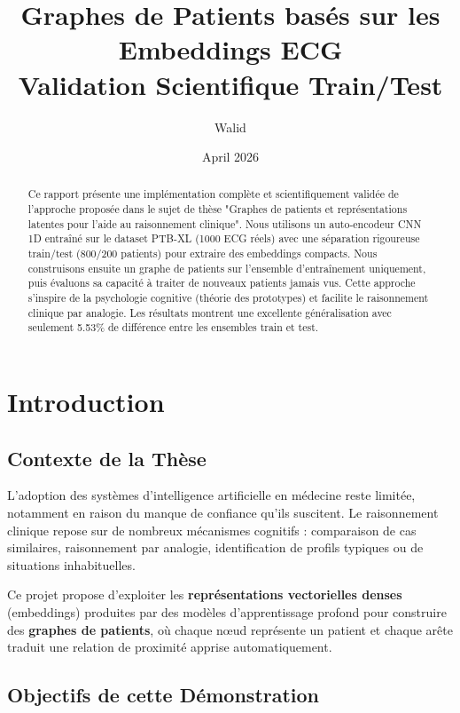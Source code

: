 \documentclass[12pt,a4paper]{article}
\title{\textbf{Graphes de Patients basés sur les Embeddings ECG} \\
\large{Validation Scientifique Train/Test}}
\author{Walid}
\date{April 2026}
\begin{document}
\maketitle

\begin{abstract}
Ce rapport présente une implémentation complète et scientifiquement validée de l'approche proposée dans le sujet de thèse "Graphes de patients et représentations latentes pour l'aide au raisonnement clinique". Nous utilisons un auto-encodeur CNN 1D entraîné sur le dataset PTB-XL (1000 ECG réels) avec une séparation rigoureuse train/test (800/200 patients) pour extraire des embeddings compacts. Nous construisons ensuite un graphe de patients sur l'ensemble d'entraînement uniquement, puis évaluons sa capacité à traiter de nouveaux patients jamais vus. Cette approche s'inspire de la psychologie cognitive (théorie des prototypes) et facilite le raisonnement clinique par analogie. Les résultats montrent une excellente généralisation avec seulement 5.53\% de différence entre les ensembles train et test.
\end{abstract}

\tableofcontents
\newpage

\section{Introduction}

\subsection{Contexte de la Thèse}

L'adoption des systèmes d'intelligence artificielle en médecine reste limitée, notamment en raison du manque de confiance qu'ils suscitent. Le raisonnement clinique repose sur de nombreux mécanismes cognitifs : comparaison de cas similaires, raisonnement par analogie, identification de profils typiques ou de situations inhabituelles.

Ce projet propose d'exploiter les \textbf{représentations vectorielles denses} (embeddings) produites par des modèles d'apprentissage profond pour construire des \textbf{graphes de patients}, où chaque nœud représente un patient et chaque arête traduit une relation de proximité apprise automatiquement.

\subsection{Objectifs de cette Démonstration}
\end{document}
